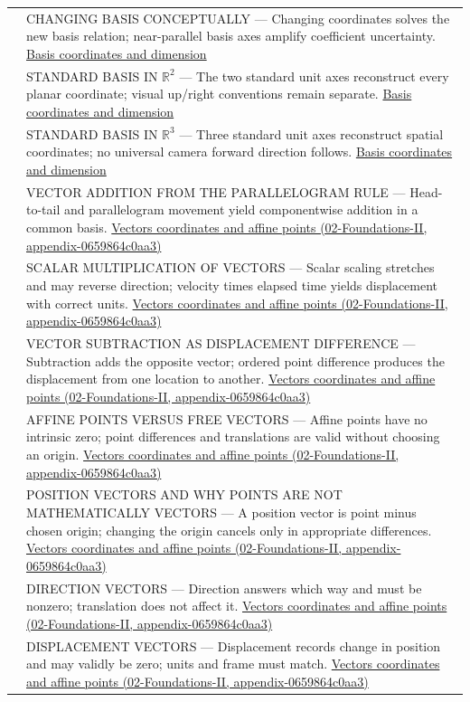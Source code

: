 {\begin{longtable}[]{@{}
  >{\raggedright\arraybackslash}p{}
  >{\raggedright\arraybackslash}p{}@{}}
515 & CHANGING BASIS CONCEPTUALLY --- Changing coordinates solves the new basis relation; near-parallel basis axes amplify coefficient uncertainty. \hyperref[appendix-ce0341f7ea0d]{Basis coordinates and dimension} \\
516 & STANDARD BASIS IN \(\mathbb R^2\) --- The two standard unit axes reconstruct every planar coordinate; visual up/right conventions remain separate. \hyperref[appendix-ce0341f7ea0d]{Basis coordinates and dimension} \\
517 & STANDARD BASIS IN \(\mathbb R^3\) --- Three standard unit axes reconstruct spatial coordinates; no universal camera forward direction follows. \hyperref[appendix-ce0341f7ea0d]{Basis coordinates and dimension} \\
518 & VECTOR ADDITION FROM THE PARALLELOGRAM RULE --- Head-to-tail and parallelogram movement yield componentwise addition in a common basis. \href{}{Vectors coordinates and affine points (02-Foundations-II, appendix-0659864c0aa3)} \\
519 & SCALAR MULTIPLICATION OF VECTORS --- Scalar scaling stretches and may reverse direction; velocity times elapsed time yields displacement with correct units. \href{}{Vectors coordinates and affine points (02-Foundations-II, appendix-0659864c0aa3)} \\
520 & VECTOR SUBTRACTION AS DISPLACEMENT DIFFERENCE --- Subtraction adds the opposite vector; ordered point difference produces the displacement from one location to another. \href{}{Vectors coordinates and affine points (02-Foundations-II, appendix-0659864c0aa3)} \\
521 & AFFINE POINTS VERSUS FREE VECTORS --- Affine points have no intrinsic zero; point differences and translations are valid without choosing an origin. \href{}{Vectors coordinates and affine points (02-Foundations-II, appendix-0659864c0aa3)} \\
522 & POSITION VECTORS AND WHY POINTS ARE NOT MATHEMATICALLY VECTORS --- A position vector is point minus chosen origin; changing the origin cancels only in appropriate differences. \href{}{Vectors coordinates and affine points (02-Foundations-II, appendix-0659864c0aa3)} \\
523 & DIRECTION VECTORS --- Direction answers which way and must be nonzero; translation does not affect it. \href{}{Vectors coordinates and affine points (02-Foundations-II, appendix-0659864c0aa3)} \\
524 & DISPLACEMENT VECTORS --- Displacement records change in position and may validly be zero; units and frame must match. \href{}{Vectors coordinates and affine points (02-Foundations-II, appendix-0659864c0aa3)} \\

\end{longtable}}
